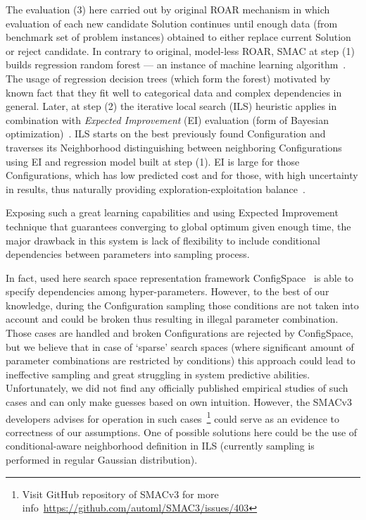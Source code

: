 The evaluation (3) here carried out by original ROAR mechanism in which evaluation of each new candidate Solution continues until enough data (from benchmark set of problem instances) obtained to either replace current Solution or reject candidate. In contrary to original, model-less ROAR, SMAC at step (1) builds regression random forest — an instance of machine learning algorithm~\cite{breiman2001random}. The usage of regression decision trees (which form the forest) motivated by known fact that they fit well to categorical data and complex dependencies in general. Later, at step (2) the iterative local search (ILS) heuristic applies in combination with \emph{Expected Improvement} (EI) evaluation (form of Bayesian optimization)~\cite{shahriari2015taking}. ILS starts on the best previously found Configuration and traverses its Neighborhood distinguishing between neighboring Configurations using EI and regression model built at step (1). EI is large for those Configurations, which has low predicted cost and for those, with high uncertainty in results, thus naturally providing exploration-exploitation balance~\cite{jones1998efficient}.

Exposing such a great learning capabilities and using Expected Improvement technique that guarantees converging to global optimum given enough time, the major drawback in this system is lack of flexibility to include conditional dependencies between parameters into sampling process. 

In fact, used here search space representation framework ConfigSpace~\cite{configspace} is able to specify dependencies among hyper-parameters. However, to the best of our knowledge, during the Configuration sampling those conditions are not taken into account and could be broken thus resulting in illegal parameter combination. Those cases are handled and broken Configurations are rejected by ConfigSpace, but we believe that in case of `sparse' search spaces (where significant amount of parameter combinations are restricted by conditions) this approach could lead to ineffective sampling and great struggling in system predictive abilities. Unfortunately, we did not find any officially published empirical studies of such cases and can only make guesses based on own intuition. However, the SMACv3 developers advises for operation in such cases~\footnote{Visit GitHub repository of SMACv3 for more info~\url{https://github.com/automl/SMAC3/issues/403}} could serve as an evidence to correctness of our assumptions. One of possible solutions here could be the use of conditional-aware neighborhood definition in ILS (currently sampling is performed in regular Gaussian distribution). 

